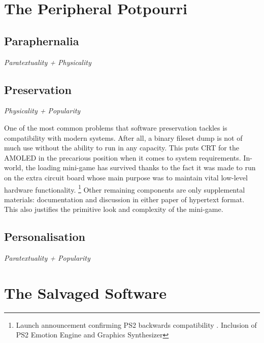 \documentclass[12pt,oneside]{book}
\begin{document}
\section{The Peripheral Potpourri}

\subsection*{Paraphernalia}\hfill\textit{Paratextuality + Physicality}
    \nocite{tex-dnd}\nocite{tunic}

\subsection*{Preservation}\hfill\textit{Physicality + Popularity}\par
One of the most common problems that software preservation tackles is compatibility with modern systems.
After all, a binary fileset dump is not of much use without the ability to run in any capacity.
This puts CRT for the AMOLED in the precarious position when it comes to system requirements.
In-world, the loading mini-game has survived thanks to the fact it was made to run on the extra circuit board whose main purpose was to maintain vital low-level hardware functionality.
\footnote{Launch announcement confirming PS2 backwards compatibility \parencite{scea2006}.
    Inclusion of PS2 Emotion Engine and Graphics Synthesizer\cite{whirlpool}
    }
Other remaining components are only supplemental materials: documentation and discussion in either paper of hypertext format.
This also justifies the primitive look and complexity of the mini-game.

\subsection*{Personalisation}\hfill\textit{Paratextuality + Popularity}

\section{The Salvaged Software}
\end{document}
